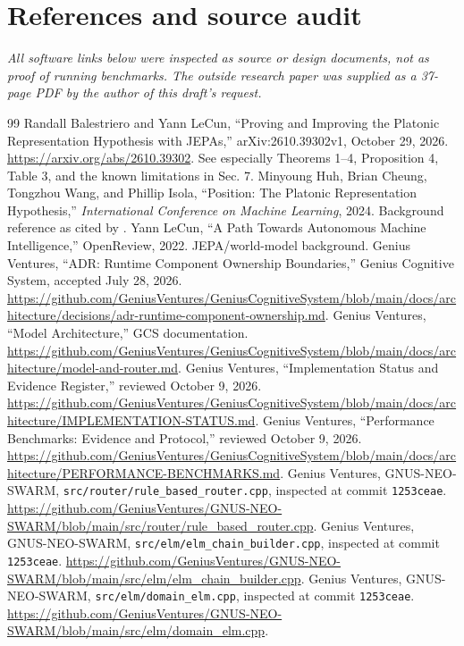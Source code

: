 \documentclass[10pt,letterpaper]{article}
\newcommand{\code}[1]{\texttt{#1}}
\begin{document}
\section*{References and source audit}
\noindent\textit{All software links below were inspected as source or design documents, not as proof of running benchmarks. The outside research paper was supplied as a 37-page PDF by the author of this draft's request.}
\vspace{5pt}
\begin{thebibliography}{99}\setlength{\itemsep}{3pt}
 Randall Balestriero and Yann LeCun, ``Proving and Improving the Platonic Representation Hypothesis with JEPAs,'' arXiv:2610.39302v1, October 29, 2026. \url{https://arxiv.org/abs/2610.39302}. See especially Theorems 1--4, Proposition 4, Table 3, and the known limitations in Sec. 7.
 Minyoung Huh, Brian Cheung, Tongzhou Wang, and Phillip Isola, ``Position: The Platonic Representation Hypothesis,'' \emph{International Conference on Machine Learning}, 2024. Background reference as cited by \cite{balestriero2026}.
 Yann LeCun, ``A Path Towards Autonomous Machine Intelligence,'' OpenReview, 2022. JEPA/world-model background.
 Genius Ventures, ``ADR: Runtime Component Ownership Boundaries,'' Genius Cognitive System, accepted July 28, 2026. \url{https://github.com/GeniusVentures/GeniusCognitiveSystem/blob/main/docs/architecture/decisions/adr-runtime-component-ownership.md}.
 Genius Ventures, ``Model Architecture,'' GCS documentation. \url{https://github.com/GeniusVentures/GeniusCognitiveSystem/blob/main/docs/architecture/model-and-router.md}.
 Genius Ventures, ``Implementation Status and Evidence Register,'' reviewed October 9, 2026. \url{https://github.com/GeniusVentures/GeniusCognitiveSystem/blob/main/docs/architecture/IMPLEMENTATION-STATUS.md}.
 Genius Ventures, ``Performance Benchmarks: Evidence and Protocol,'' reviewed October 9, 2026. \url{https://github.com/GeniusVentures/GeniusCognitiveSystem/blob/main/docs/architecture/PERFORMANCE-BENCHMARKS.md}.
 Genius Ventures, GNUS-NEO-SWARM, \code{src/router/rule\_based\_router.cpp}, inspected at commit \code{1253ceae}. \url{https://github.com/GeniusVentures/GNUS-NEO-SWARM/blob/main/src/router/rule_based_router.cpp}.
 Genius Ventures, GNUS-NEO-SWARM, \code{src/elm/elm\_chain\_builder.cpp}, inspected at commit \code{1253ceae}. \url{https://github.com/GeniusVentures/GNUS-NEO-SWARM/blob/main/src/elm/elm_chain_builder.cpp}.
 Genius Ventures, GNUS-NEO-SWARM, \code{src/elm/domain\_elm.cpp}, inspected at commit \code{1253ceae}. \url{https://github.com/GeniusVentures/GNUS-NEO-SWARM/blob/main/src/elm/domain_elm.cpp}.
\end{thebibliography}
\end{document}

